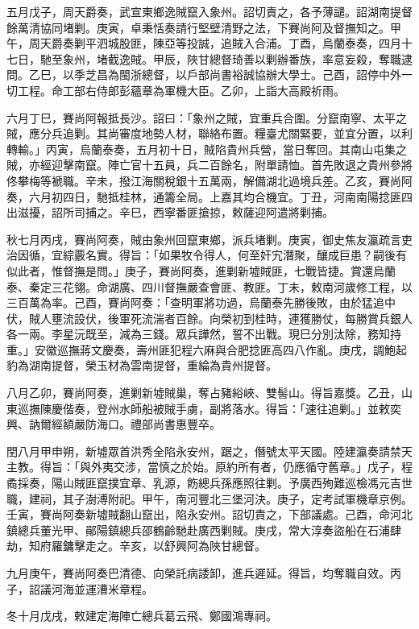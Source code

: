 \begin{pinyinscope}
五月戊子，周天爵奏，武宣東鄉逸賊竄入象州。詔切責之，各予薄譴。詔湖南提督餘萬清協同堵剿。庚寅，卓秉恬奏請行堅壁清野之法，下賽尚阿及督撫知之。甲午，周天爵奏剿平泗城股匪，陳亞等投誠，追賊入合浦。丁酉，烏蘭泰奏，四月十七日，馳至象州，堵截逸賊。甲辰，陜甘總督琦善以剿辦番族，率意妄殺，奪職逮問。乙巳，以季芝昌為閩浙總督，以戶部尚書裕誠協辦大學士。己酉，詔停中外一切工程。命工部右侍郎彭蘊章為軍機大臣。乙卯，上詣大高殿祈雨。

六月丁巳，賽尚阿報抵長沙。詔曰：「象州之賊，宜重兵合圍。分竄南寧、太平之賊，應分兵追剿。其尚審度地勢人材，聯絡布置。糧臺尤關緊要，並宜分置，以利轉輸。」丙寅，烏蘭泰奏，五月初十日，賊陷貴州兵營，當日奪回。其南山屯集之賊，亦經迎擊南竄。陣亡官十五員，兵二百餘名，附單請恤。首先敗退之貴州參將佟攀梅等褫職。辛未，撥江海關稅銀十五萬兩，解備湖北過境兵差。乙亥，賽尚阿奏，六月初四日，馳抵桂林，通籌全局。上嘉其均合機宜。丁丑，河南南陽捻匪四出滋擾，詔所司捕之。辛巳，西寧番匪搶掠，敕薩迎阿遣將剿捕。

秋七月丙戌，賽尚阿奏，賊由象州回竄東鄉，派兵堵剿。庚寅，御史焦友瀛疏言吏治因循，宜綜覈名實。得旨：「如果牧令得人，何至奸宄潛聚，釀成巨患？嗣後有似此者，惟督撫是問。」庚子，賽尚阿奏，進剿新墟賊匪，七戰皆捷。賞還烏蘭泰、秦定三花翎。命湖廣、四川督撫嚴查會匪、教匪。丁未，敕南河歲修工程，以三百萬為率。己酉，賽尚阿奏：「查明軍將功過，烏蘭泰先勝後敗，由於猛追中伏，賊人壅流設伏，後軍死流湍者百餘。向榮初到桂時，連獲勝仗，每勝賞兵銀人各一兩。李星沅既至，減為三錢。眾兵譁然，誓不出戰。現巳分別汰除，務知持重。」安徽巡撫蔣文慶奏，壽州匪犯程六麻與合肥捻匪高四八作亂。庚戌，調鮑起豹為湖南提督，榮玉材為雲南提督，重綸為貴州提督。

八月乙卯，賽尚阿奏，進剿新墟賊巢，奪占豬綌峽、雙髻山。得旨嘉獎。乙丑，山東巡撫陳慶偕奏，登州水師船被賊手虜，副將落水。得旨：「速往追剿。」並敕奕興、訥爾經額嚴防海口。禮部尚書惠豐卒。

閏八月甲申朔，新墟眾首洪秀全陷永安州，踞之，僭號太平天國。陸建瀛奏請禁天主教。得旨：「與外夷交涉，當慎之於始。原約所有者，仍應循守舊章。」戊子，程矞採奏，陽山賊匪竄撲宜章、乳源，飭總兵孫應照往剿。予廣西殉難巡檢馮元吉世職，建祠，其子澍溥附祀。甲午，南河豐北三堡河決。庚子，定考試軍機章京例。壬寅，賽尚阿奏新墟賊翻山竄出，陷永安州。詔切責之，下部議處。己酉，命河北鎮總兵董光甲、鄖陽鎮總兵邵鶴齡馳赴廣西剿賊。庚戌，常大淳奏盜船在石浦肆劫，知府羅鏞擊走之。辛亥，以舒興阿為陜甘總督。

九月庚午，賽尚阿奏巴清德、向榮託病諉卸，進兵遲延。得旨，均奪職自效。丙子，詔議河海並運漕米章程。

冬十月戊戌，敕建定海陣亡總兵葛云飛、鄭國鴻專祠。


\end{pinyinscope}
